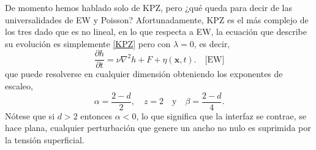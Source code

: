 De momento hemos hablado solo de KPZ, pero ¿qué queda para decir de las universalidades de EW y Poisson? Afortunadamente, KPZ es el más complejo de los tres dado que es no lineal, en lo que respecta a EW, la ecuación que describe su evolución es simplemente \ref{KPZ} pero con $\lambda=0$, es decir,
\begin{equation}
    \frac{\partial h}{\partial t} = \nu \nabla^2h + F + \eta(\mathbf{x},t). \quad \text{[EW]}
    \label{EW}
\end{equation}
que puede resolverse en cualquier dimensión obteniendo los exponentes de escaleo,
\begin{equation}
    \alpha = \frac{2-d}{2}, \quad z = 2 \quad \text{y} \quad \beta = \frac{2-d}{4}.
\end{equation}
Nótese que si $d>2$ entonces $\alpha<0$, lo que significa que la interfaz se contrae, se hace plana, cualquier perturbación que genere un ancho no nulo es suprimida por la tensión superficial.

